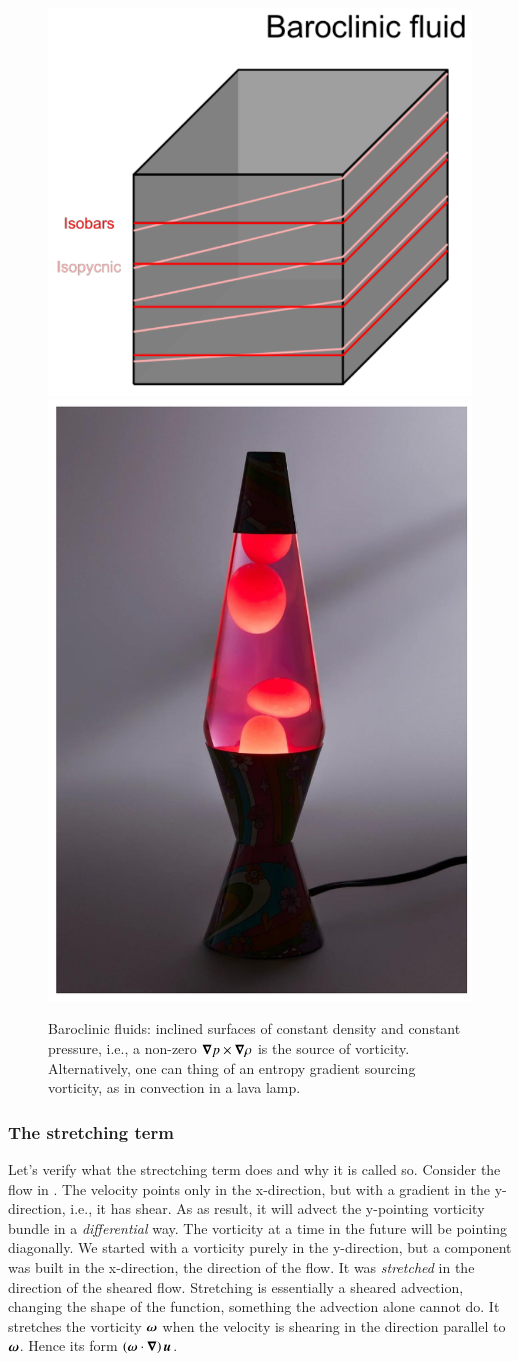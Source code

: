 \begin{figure}
  \begin{center}
    \includegraphics[height=.45\linewidth]{./figs/baroclinicfluid.png}
    \includegraphics[height=.45\linewidth]{./figs/lavalamp.png} 
  \end{center}
  \caption[]{Baroclinic fluids: inclined surfaces of constant density
    and constant pressure, i.e., a non-zero
    ${\boldsymbol{\nabla}}{p}\times{\boldsymbol{\nabla}}{\rho}$ is the source of
    vorticity. Alternatively, one can thing of an entropy gradient
    sourcing vorticity, as in convection in a lava lamp.}
  \label{fig:baroclinic}
\end{figure}


\subsubsection{The stretching term}

Let's verify what the strectching term does and why it is called
so. Consider the flow in . The velocity points
only in the x-direction, but with a gradient in the y-direction, i.e.,
it has shear. As as
result, it will advect the y-pointing vorticity bundle in a {\it differential}
way. The vorticity at a time in the future will be pointing
diagonally. We started with a vorticity purely in the y-direction, but
a component was built in the x-direction, the direction of the
flow. It was {\it stretched} in the direction of the sheared
flow. Stretching is essentially a sheared advection, changing the
shape of the function, something the advection alone cannot do. It
stretches the vorticity ${\boldsymbol{\omega}}$ when the velocity is shearing
in the direction parallel to ${\boldsymbol{\omega}}$. Hence its form
$\left({\boldsymbol{\omega}}\cdot{\boldsymbol{\nabla}}\right) {\boldsymbol{u}}$. 

